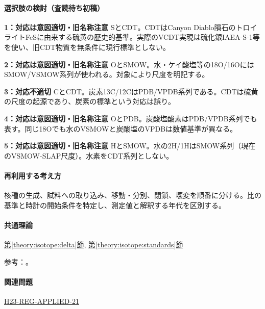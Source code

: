 \paragraph{選択肢の検討（査読待ち初稿）}\mbox{}\par

\noindent\textbf{1：対応は意図適切・旧名称注意} SとCDT。CDTはCanyon Diablo隕石のトロイライトFeSに由来する硫黄の歴史的基準。実際のVCDT実現は硫化銀IAEA-S-1等を使い、旧CDT物質を無条件に現行標準としない。\par

\noindent\textbf{2：対応は意図適切・旧名称注意} OとSMOW。水・ケイ酸塩等の18O/16OにはSMOW/VSMOW系列が使われる。対象により尺度を明記する。\par

\noindent\textbf{3：対応不適切} CとCDT。炭素13C/12CはPDB/VPDB系列である。CDTは硫黄の尺度の起源であり、炭素の標準という対応は誤り。\par

\noindent\textbf{4：対応は意図適切・旧名称注意} OとPDB。炭酸塩酸素はPDB/VPDB系列でも表す。同じ18Oでも水のVSMOWと炭酸塩のVPDBは数値基準が異なる。\par

\noindent\textbf{5：対応は意図適切・旧名称注意} HとSMOW。水の2H/1HはSMOW系列（現在のVSMOW-SLAP尺度）。水素をCDT系列としない。\par

\paragraph{再利用する考え方} 核種の生成、試料への取り込み、移動・分別、閉鎖、壊変を順番に分ける。比の基準と時計の開始条件を特定し、測定値と解釈する年代を区別する。

\paragraph{共通理論} \hyperref[theory:isotope:delta]{第\ref*{theory:isotope:delta}節}, \hyperref[theory:isotope:standards]{第\ref*{theory:isotope:standards}節}

\par 参考：\cite{iso_standards1995,iso_vsmow2,iso_vcdt}。

\paragraph{関連問題} \hyperref[q:h23-reg-applied-21]{H23-REG-APPLIED-21}

